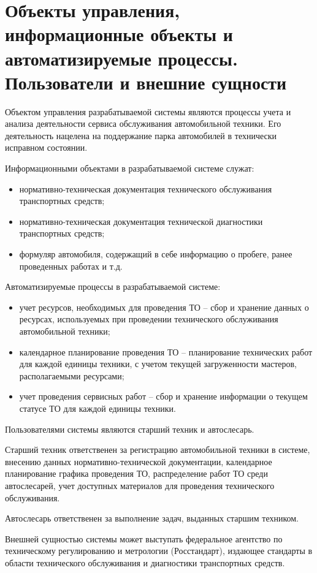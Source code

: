 \section{Объекты управления, информационные объекты и автоматизируемые процессы.
  Пользователи и внешние сущности}
Объектом управления разрабатываемой системы являются процессы учета и анализа
деятельности сервиса обслуживания автомобильной техники.
Его деятельность нацелена на поддержание парка автомобилей в технически
исправном состоянии.

Информационными объектами в разрабатываемой системе служат:
\begin{itemize}
	\item нормативно-техническая документация технического обслуживания
		транспортных средств;
	\item нормативно-техническая документация технической диагностики
		транспортных средств;
	\item формуляр автомобиля, содержащий в себе информацию о пробеге,
		ранее проведенных работах и т.д.
\end{itemize}

Автоматизируемые процессы в разрабатываемой системе:
\begin{itemize}
	\item учет ресурсов, необходимых для проведения ТО -- сбор и хранение данных
		о ресурсах, используемых при проведении технического обслуживания
		автомобильной техники;
	\item календарное планирование проведения ТО -- планирование технических
		работ для каждой единицы техники, с учетом текущей загруженности
		мастеров, располагаемыми ресурсами;
	\item учет проведения сервисных работ -- сбор и хранение информации о
		текущем статусе ТО для каждой единицы техники.
\end{itemize}

Пользователями системы являются старший техник и автослесарь.

Старший техник ответственен за регистрацию автомобильной техники в системе,
внесению данных нормативно-технической документации, календарное планирование
графика проведения ТО, распределение работ ТО среди автослесарей, учет доступных
материалов для проведения технического обслуживания.

Автослесарь ответственен за выполнение задач, выданных старшим техником.

Внешней сущностью системы может выступать федеральное агентство по техническому
регулированию и метрологии (Росстандарт), издающее стандарты в области
технического обслуживания и диагностики транспортных средств.
